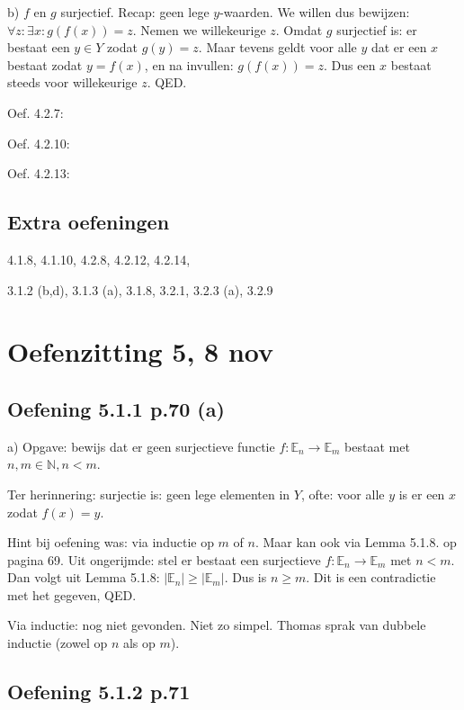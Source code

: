 \documentclass{article}
\begin{document}
b) $f$ en $g$ surjectief. Recap: geen lege $y$-waarden. We willen dus bewijzen: $\forall z: \exists x: g(f(x)) = z$. Nemen we willekeurige $z$. Omdat $g$ surjectief is: er bestaat een $y \in Y$ zodat $g(y)=z$. Maar tevens geldt voor alle $y$ dat er een $x$ bestaat zodat $y=f(x)$, en na invullen: $g(f(x))=z$. Dus een $x$ bestaat steeds voor willekeurige $z$. QED. 



Oef. 4.2.7: 

Oef. 4.2.10: 

Oef. 4.2.13: 


\subsection{Extra oefeningen}

 4.1.8, 4.1.10, 4.2.8, 4.2.12, 4.2.14,

3.1.2 (b,d), 3.1.3 (a), 3.1.8, 3.2.1, 3.2.3 (a), 3.2.9


\section{Oefenzitting 5, 8 nov}

\subsection{Oefening 5.1.1 p.70 (a)} 

a) Opgave: bewijs dat er geen surjectieve functie $f: \mathbb{E}_n \rightarrow \mathbb{E}_m$ bestaat met $n,m \in \mathbb{N}, n <m$. 

Ter herinnering: surjectie is: geen lege elementen in $Y$, ofte: voor alle $y$ is er een $x$ zodat $f(x)=y$. 

Hint bij oefening was: via inductie op $m$ of $n$. Maar kan ook via Lemma 5.1.8. op pagina 69. Uit ongerijmde: stel er bestaat een surjectieve $f: \mathbb{E}_n \rightarrow \mathbb{E}_m$ met $n<m$. Dan volgt uit Lemma 5.1.8: $|\mathbb{E}_n | \geq | \mathbb{E}_m |$. Dus is $n \geq m$. Dit is een contradictie met het gegeven, QED. 

Via inductie: nog niet gevonden. Niet zo simpel. Thomas sprak van dubbele inductie (zowel op $n$ als op $m$). 



\subsection{Oefening 5.1.2 p.71}
\end{document}
